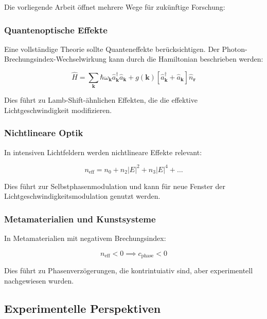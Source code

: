 \documentclass[a4paper,12pt]{article}
\theoremstyle{definition}
\theoremstyle{remark}
\newcommand{\cLight}{c}
\newcommand{\refIndex}{n}
\begin{document}
Die vorliegende Arbeit öffnet mehrere Wege für zukünftige Forschung:

\subsubsection{Quantenoptische Effekte}

Eine vollständige Theorie sollte Quanteneffekte berücksichtigen. Der Photon-Brechungsindex-Wechselwirkung kann durch die Hamiltonian beschrieben werden:

\begin{equation}
    \hat{H} = \sum_{\mathbf{k}} \hbar \omega_{\mathbf{k}} \hat{a}_{\mathbf{k}}^\dagger \hat{a}_{\mathbf{k}} + g(\mathbf{k}) [\hat{a}_{\mathbf{k}}^\dagger + \hat{a}_{\mathbf{k}}] \hat{n}_{\mathbf{r}}
\end{equation}

Dies führt zu Lamb-Shift-ähnlichen Effekten, die die effektive Lichtgeschwindigkeit modifizieren.

\subsubsection{Nichtlineare Optik}

In intensiven Lichtfeldern werden nichtlineare Effekte relevant:

\begin{equation}
    n_{\text{eff}} = n_0 + n_2 |E|^2 + n_3 |E|^4 + \ldots
\end{equation}

Dies führt zur Selbstphasenmodulation und kann für neue Fenster der Lichtgeschwindigkeitsmodulation genutzt werden.

\subsubsection{Metamaterialien und Kunstsysteme}

In Metamaterialien mit negativem Brechungsindex:

\begin{equation}
    \refIndex_{\text{eff}} < 0 \implies \cLight_{\text{phase}} < 0
\end{equation}

Dies führt zu Phasenverzögerungen, die kontrintuiativ sind, aber experimentell nachgewiesen wurden.

\subsection{Experimentelle Perspektiven}
\end{document}
